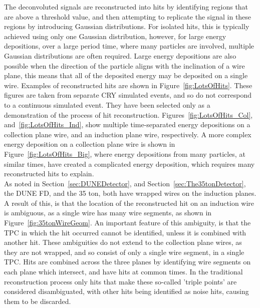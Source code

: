 The deconvoluted signals are reconstructed into hits by identifying regions that are above a threshold value, and then attempting to replicate the signal in these regions by introducing Gaussian distributions. For isolated hits, this is typically achieved using only one Gaussian distribution, however, for large energy depositions, over a large period time, where many particles are involved, multiple Gaussian distributions are often required. Large energy depositions are also possible when the direction of the particle aligns with the inclination of a wire plane, this means that all of the deposited energy may be deposited on a single wire. Examples of reconstructed hits are shown in Figure~\ref{fig:LotsOfHits}. These figures are taken from separate CRY simulated events, and so do not correspond to a continuous simulated event. They have been selected only as a demonstration of the process of hit reconstruction. Figures~\ref{fig:LotsOfHits_Col}, and~\ref{fig:LotsOfHits_Ind}, show multiple time-separated energy depositions on a collection plane wire, and an induction plane wire, respectively. A more complex energy deposition on a collection plane wire is shown in Figure~\ref{fig:LotsOfHits_Big}, where energy depositions from many particles, at similar times, have created a complicated energy deposition, which requires many reconstructed hits to explain. \\

As noted in Section~\ref{sec:DUNEDetector}, and Section~\ref{sec:The35tonDetector}, the DUNE FD, and the 35 ton, both have wrapped wires on the induction planes. A result of this, is that the location of the reconstructed hit on an induction wire is ambiguous, as a single wire has many wire segments, as shown in Figure~\ref{fig:35tonWireGeom}. An important feature of this ambiguity, is that the TPC in which the hit occurred cannot be identified, unless it is combined with another hit. These ambiguities do not extend to the collection plane wires, as they are not wrapped, and so consist of only a single wire segment, in a single TPC. Hits are combined across the three planes by identifying wire segments on each plane which intersect, and have hits at common times. In the traditional reconstruction process only hits that make these so-called 'triple points' are considered disambiguated, with other hits being identified as noise hits, causing them to be discarded. \\

